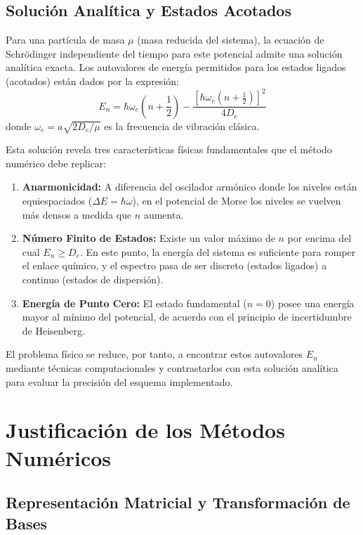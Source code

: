 \documentclass[11pt,fleqn]{article}
\begin{document}
\subsection{Solución Analítica y Estados Acotados}

Para una partícula de masa $\mu$ (masa reducida del sistema), la ecuación de Schrödinger independiente del tiempo para este potencial admite una solución analítica exacta. Los autovalores de energía permitidos para los estados ligados (acotados) están dados por la expresión:
\begin{equation}
    E_n = \hbar \omega_e \left( n + \frac{1}{2} \right) - \frac{\left[ \hbar \omega_e \left( n + \frac{1}{2} \right) \right]^2}{4D_e}
\end{equation}
donde $\omega_e = a\sqrt{2D_e/\mu}$ es la frecuencia de vibración clásica. 

Esta solución revela tres características físicas fundamentales que el método numérico debe replicar:
\begin{enumerate}
    \item \textbf{Anarmonicidad:} A diferencia del oscilador armónico donde los niveles están equiespaciados ($\Delta E = \hbar \omega$), en el potencial de Morse los niveles se vuelven más densos a medida que $n$ aumenta.
    \item \textbf{Número Finito de Estados:} Existe un valor máximo de $n$ por encima del cual $E_n \geq D_e$. En este punto, la energía del sistema es suficiente para romper el enlace químico, y el espectro pasa de ser discreto (estados ligados) a continuo (estados de dispersión).
    \item \textbf{Energía de Punto Cero:} El estado fundamental ($n=0$) posee una energía mayor al mínimo del potencial, de acuerdo con el principio de incertidumbre de Heisenberg.
\end{enumerate}

El problema físico se reduce, por tanto, a encontrar estos autovalores $E_n$ mediante técnicas computacionales y contrastarlos con esta solución analítica para evaluar la precisión del esquema implementado.
\section{Justificación de los Métodos Numéricos}


\subsection{Representación Matricial y Transformación de Bases}
\end{document}
